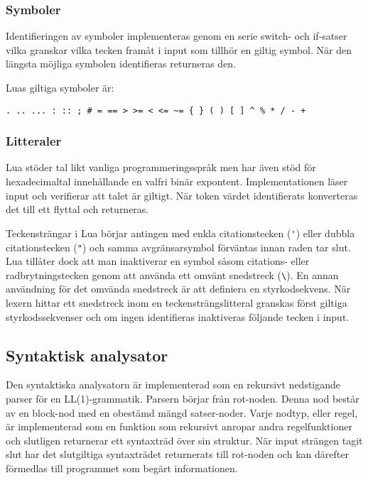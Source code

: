 \subsubsection{Symboler}

Identifieringen av symboler implementeras genom en serie switch- och
if-satser vilka granskar vilka tecken framåt i input som tillhör en giltig
symbol. När den längsta möjliga symbolen identifieras returneras den.

Luas giltiga symboler är:
\begin{verbatim}
. .. ... : :: ; # = == > >= < <= ~= { } ( ) [ ] ^ % * / - +
\end{verbatim}

\subsubsection{Litteraler}

Lua stöder tal likt vanliga programmeringsspråk men har även stöd för
hexadecimaltal innehållande en valfri binär expontent. Implementationen läser
input och verifierar att talet är giltigt. När token värdet identifierats
konverteras det till ett flyttal och returneras.

Teckensträngar i Lua börjar antingen med enkla citationstecken (\verb+'+)
eller dubbla citationstecken (\verb+"+) och samma avgränsarsymbol förväntas
innan raden tar slut. Lua tillåter dock att man inaktiverar en symbol såsom
citations- eller radbrytningstecken genom att använda ett omvänt snedstreck
(\verb+\+). En annan användning för det omvända snedstreck är att definiera en
styrkodsekvens.  När lexern hittar ett snedstreck inom en
teckensträngslitteral granskas först giltiga styrkodssekvenser och om ingen
identifieras inaktiveras följande tecken i input.

\subsection{Syntaktisk analysator}

Den syntaktiska analysatorn är implementerad som en rekursivt nedstigande
parser för en LL(1)-grammatik. Parsern börjar från
rot-noden. Denna nod består av en block-nod med en obestämd mängd
satser-noder. Varje nodtyp, eller regel, är implementerad som en funktion som
rekursivt anropar andra regelfunktioner och slutligen returnerar ett
syntaxträd över sin struktur. När input strängen tagit slut har det
slutgiltiga syntaxträdet returnerats till rot-noden och kan därefter förmedlas
till programmet som begärt informationen.

